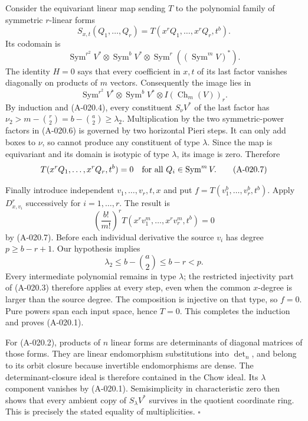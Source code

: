 Consider the equivariant linear map sending $T$ to the
polynomial family of symmetric $r$-linear forms
\[
 S_{x,t}(Q_1,\ldots,Q_r)
             =T(x^rQ_1,\ldots,x^rQ_r,t^b).
\]
Its codomain is
\[
 \operatorname{Sym}^{r^2}V^*\otimes\operatorname{Sym}^bV^*
             \otimes\operatorname{Sym}^r((\operatorname{Sym}^mV)^*).
\]
The identity $H=0$ says that every coefficient in $x,t$
of its last factor vanishes diagonally on products of $m$
vectors. Consequently the image lies in
\[
 \operatorname{Sym}^{r^2}V^*\otimes\operatorname{Sym}^bV^*
                         \otimes I(\operatorname{Ch}_m(V))_r.
                                                               \tag{A-020.6}
\]
By induction and (A-020.4), every constituent $S_\nu V^*$
of the last factor has
$\nu_2>m-\binom r2=b-\binom a2\geq\lambda_2$.
Multiplication by the two symmetric-power factors in (A-020.6)
is governed by two horizontal Pieri steps. It can only add boxes
to $\nu$, so cannot produce any constituent of type $\lambda$.
Since the map is equivariant and its domain is isotypic of type
$\lambda$, its image is zero. Therefore
\[
 T(x^rQ_1,\ldots,x^rQ_r,t^b)=0
       \quad\hbox{for all }Q_i\in\operatorname{Sym}^mV.       \tag{A-020.7}
\]

Finally introduce independent $v_1,\ldots,v_r,t,x$ and put
$f=T(v_1^b,\ldots,v_r^b,t^b)$. Apply $D_{x,v_i}^r$
successively for $i=1,\ldots,r$. The result is
\[
 \left(\frac{b!}{m!}\right)^r
                 T(x^rv_1^m,\ldots,x^rv_r^m,t^b)=0
\]
by (A-020.7). Before each individual derivative the source
$v_i$ has degree $p\geq b-r+1$. Our hypothesis implies
\[
 \lambda_2\leq b-\binom a2\leq b-r<p.
\]
Every intermediate polynomial remains in type $\lambda$;
the restricted injectivity part of (A-020.3) therefore applies
at every step, even when the common $x$-degree is larger than
the source degree. The composition is injective on that type,
so $f=0$. Pure powers span each input space, hence $T=0$.
This completes the induction and proves (A-020.1).

For (A-020.2), products of $n$ linear forms are determinants
of diagonal matrices of those forms. They are linear
endomorphism substitutions into $\det_n$, and belong to its
orbit closure because invertible endomorphisms are dense.
The determinant-closure ideal is therefore contained in the
Chow ideal. Its $\lambda$ component vanishes by (A-020.1).
Semisimplicity in characteristic zero then shows that every
ambient copy of $S_\lambda V^*$ survives in the quotient
coordinate ring. This is precisely the stated equality of
multiplicities. \hfill$\square$

